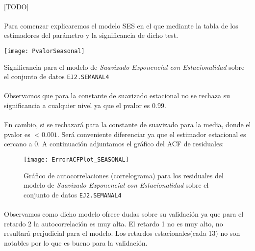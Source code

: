 \documentclass[a4paper, spanish]{article}
\begin{document}
      \paragraph{}
      [TODO]

      \paragraph{}
      Para comenzar explicaremos el modelo SES en el que mediante la tabla de los estimadores del parámetro y la significancia de dicho test.

      \begin{table}[htb!]
        \centering
        \texttt{[image: PvalorSeasonal]}
        \caption{Significancia para el modelo de \emph{Suavizado Exponencial con Estacionalidad} sobre el conjunto de datos \texttt{EJ2.SEMANAL4}}
        \label{table:b_seasonal_significance}
      \end{table}

      \paragraph{}
      Observamos que para la constante de suavizado estacional no se rechaza su significancia a cualquier nivel ya que el pvalor es 0.99.

      \paragraph{}
      En cambio, si se rechazará para la constante de suavizado para la media, donde el pvalor es $<0.001$. Será conveniente diferenciar ya que el estimador estacional es cercano a 0. A continuación adjuntamos el gráfico del ACF de residuales:

      \begin{figure}[htb!]
        \centering
        \texttt{[image: ErrorACFPlot\_SEASONAL]}
        \caption{Gráfico de autocorrelaciones (correlograma) para los residuales del modelo de \emph{Suavizado Exponencial con Estacionalidad} sobre el conjunto de datos \texttt{EJ2.SEMANAL4}}
        \label{img:b_seasonal_residuals_correlogram}
      \end{figure}

      \paragraph{}
      Observamos como dicho modelo ofrece dudas sobre su validación ya que para el retardo 2 la autocorrelación es muy alta. El retardo 1 no es muy alto, no resultará perjudicial para el modelo. Los retardos estacionales(cada 13) no son notables por lo que es bueno para la validación.
\end{document}
